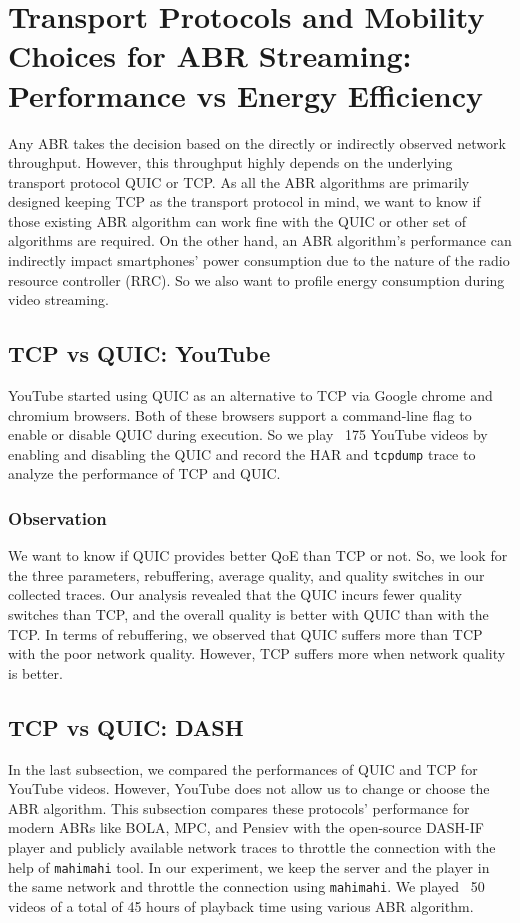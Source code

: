 \section{Transport Protocols and Mobility Choices for ABR Streaming: Performance vs Energy Efficiency}
Any ABR takes the decision based on the directly or indirectly observed network throughput. However, this throughput highly depends on the underlying transport protocol QUIC or TCP. As all the ABR algorithms are primarily designed keeping TCP as the transport protocol in mind, we want to know if those existing ABR algorithm can work fine with the QUIC or other set of algorithms are required. On the other hand, an ABR algorithm's performance can indirectly impact smartphones' power consumption due to the nature of the radio resource controller (RRC). So we also want to profile energy consumption during video streaming.

\subsection{TCP vs QUIC: YouTube}
YouTube started using QUIC as an alternative to TCP via Google chrome and chromium browsers. Both of these browsers support a command-line flag to enable or disable QUIC during execution. So we play ~175 YouTube videos by enabling and disabling the QUIC and record the HAR and {\tt tcpdump} trace to analyze the performance of TCP and QUIC. 
\subsubsection{Observation}
We want to know if QUIC provides better QoE than TCP or not. So, we look for the three parameters, rebuffering, average quality, and quality switches in our collected traces. Our analysis revealed that the QUIC incurs fewer quality switches than TCP, and the overall quality is better with QUIC than with the TCP. In terms of rebuffering, we observed that QUIC suffers more than TCP with the poor network quality. However, TCP suffers more when network quality is better.

\subsection{TCP vs QUIC: DASH}
In the last subsection, we compared the performances of QUIC and TCP for YouTube videos. However, YouTube does not allow us to change or choose the ABR algorithm. This subsection compares these protocols' performance for modern ABRs like BOLA, MPC, and Pensiev with the open-source DASH-IF player and publicly available network traces to throttle the connection with the help of {\tt mahimahi} tool. In our experiment, we keep the server and the player in the same network and throttle the connection using {\tt mahimahi}. We played ~50 videos of a total of 45 hours of playback time using various ABR algorithm.

